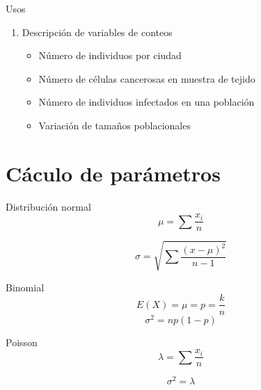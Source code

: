 \documentclass[
  11pt,
  ignorenonframetext,
]{beamer}
\providecommand{\tightlist}{%
  \setlength{\itemsep}{0pt}\setlength{\parskip}{0pt}}
\begin{document}
\begin{frame}{Usos}
\protect\hypertarget{usos-1}{}
\begin{enumerate}
\item
  Descripción de variables de conteos

  \begin{itemize}
  \tightlist
  \item
    Número de individuos por ciudad
  \item
    Número de células cancerosas en muestra de tejido
  \item
    Número de individuos infectados en una población
  \item
    Variación de tamaños poblacionales
  \end{itemize}
\end{enumerate}
\end{frame}

\hypertarget{cuxe1culo-de-paruxe1metros}{%
\section{Cáculo de parámetros}\label{cuxe1culo-de-paruxe1metros}}

\begin{frame}{Distribución normal}
\protect\hypertarget{distribuciuxf3n-normal}{}
\[\mu = \sum \frac{x_i}{n}\]

\[\sigma = \sqrt{ \sum \frac{(x-\mu)^2}{n-1}}\]
\end{frame}

\begin{frame}{Binomial}
\protect\hypertarget{binomial-1}{}
\[ E(X) = \mu = p = \frac{k}{n} \] \[ \sigma^2 = np(1-p)\]
\end{frame}

\begin{frame}{Poisson}
\protect\hypertarget{poisson-2}{}
\[ \lambda = \sum \frac{x_i}{n}\]

\[ \sigma^2 = \lambda \]
\end{frame}
\end{document}
